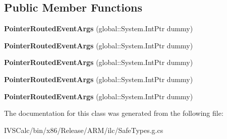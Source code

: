 \subsection*{Public Member Functions}
\begin{DoxyCompactItemize}
\item 
\mbox{\label{class_windows_1_1_u_i_1_1_xaml_1_1_input_1_1_pointer_routed_event_args_ae690100e31e6fa2ba4c13ed2643f52cf}} 
{\bfseries Pointer\+Routed\+Event\+Args} (global\+::\+System.\+Int\+Ptr dummy)
\item 
\mbox{\label{class_windows_1_1_u_i_1_1_xaml_1_1_input_1_1_pointer_routed_event_args_ae690100e31e6fa2ba4c13ed2643f52cf}} 
{\bfseries Pointer\+Routed\+Event\+Args} (global\+::\+System.\+Int\+Ptr dummy)
\item 
\mbox{\label{class_windows_1_1_u_i_1_1_xaml_1_1_input_1_1_pointer_routed_event_args_ae690100e31e6fa2ba4c13ed2643f52cf}} 
{\bfseries Pointer\+Routed\+Event\+Args} (global\+::\+System.\+Int\+Ptr dummy)
\item 
\mbox{\label{class_windows_1_1_u_i_1_1_xaml_1_1_input_1_1_pointer_routed_event_args_ae690100e31e6fa2ba4c13ed2643f52cf}} 
{\bfseries Pointer\+Routed\+Event\+Args} (global\+::\+System.\+Int\+Ptr dummy)
\item 
\mbox{\label{class_windows_1_1_u_i_1_1_xaml_1_1_input_1_1_pointer_routed_event_args_ae690100e31e6fa2ba4c13ed2643f52cf}} 
{\bfseries Pointer\+Routed\+Event\+Args} (global\+::\+System.\+Int\+Ptr dummy)
\end{DoxyCompactItemize}


The documentation for this class was generated from the following file\+:\begin{DoxyCompactItemize}
\item 
I\+V\+S\+Calc/bin/x86/\+Release/\+A\+R\+M/ilc/Safe\+Types.\+g.\+cs\end{DoxyCompactItemize}
